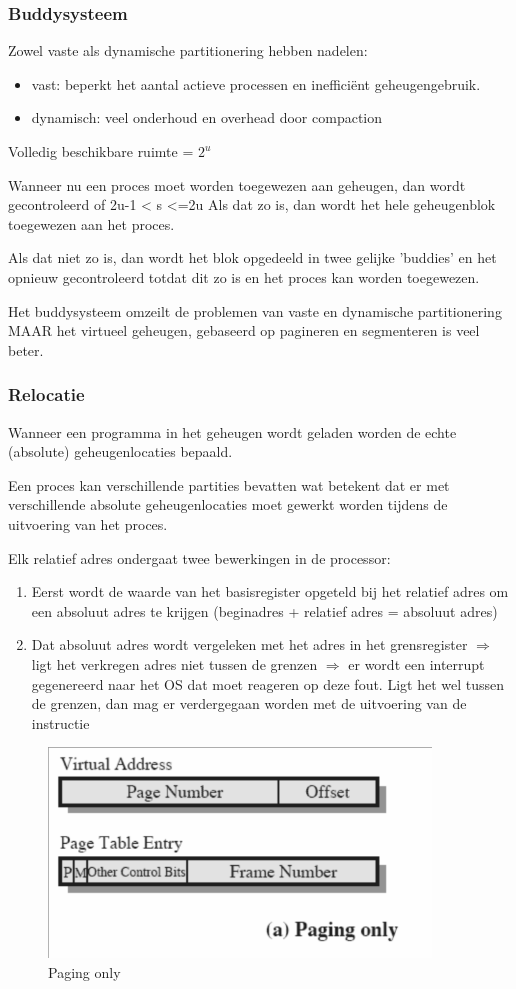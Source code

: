 \subsubsection{Buddysysteem}

Zowel vaste als dynamische partitionering hebben nadelen:

\begin{itemize}
\item vast: beperkt het aantal actieve processen en inefficiënt geheugengebruik.
\item dynamisch: veel onderhoud en overhead door compaction
\end{itemize}


Volledig beschikbare ruimte = $2^u$

Wanneer nu een proces moet worden toegewezen aan geheugen, dan wordt gecontroleerd of 2u-1 < s <=2u Als dat zo is, dan wordt het hele geheugenblok toegewezen aan het proces.

Als dat niet zo is, dan wordt het blok opgedeeld in twee gelijke 'buddies' en het opnieuw gecontroleerd totdat dit zo is en het proces kan worden toegewezen.

Het buddysysteem omzeilt de problemen van vaste en dynamische partitionering MAAR het virtueel geheugen, gebaseerd op pagineren en segmenteren is veel beter.

\subsubsection{Relocatie}

Wanneer een programma in het geheugen wordt geladen worden de echte (absolute) geheugenlocaties bepaald.

Een proces kan verschillende partities bevatten wat betekent dat er met verschillende absolute geheugenlocaties moet gewerkt worden tijdens de uitvoering van het proces.

Elk relatief adres ondergaat twee bewerkingen in de processor:

\begin{enumerate}
\item Eerst wordt de waarde van het basisregister opgeteld bij het relatief adres om een absoluut adres te krijgen (beginadres + relatief adres = absoluut adres)
\item Dat absoluut adres wordt vergeleken met het adres in het grensregister $\Rightarrow$ ligt het verkregen adres niet tussen de grenzen $\Rightarrow$ er wordt een interrupt gegenereerd naar het OS dat moet reageren op deze fout. Ligt het wel tussen de grenzen, dan mag er verdergegaan worden met de uitvoering van de instructie
\end{enumerate}

\begin{figure}[htp]
    \centering
            \includegraphics[width=4in]{img/pagineren.png}
        \caption{Paging only}
    \label{fig:Paging only}
\end{figure}